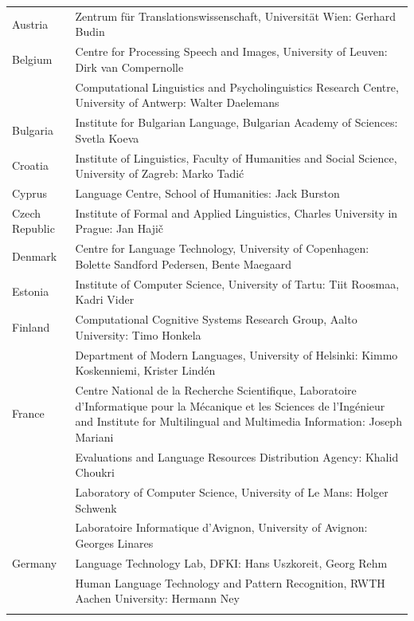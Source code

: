 \documentclass[10pt, plain]{../../metanetpaper}
\begin{document}
\begin{longtable}{@{}lp{137mm}@{}}
Austria & Zentrum für Translationswissenschaft, Universität Wien: Gerhard Budin\\ \addlinespace 
Belgium & Centre for Processing Speech and Images, University of Leuven: Dirk van Compernolle \\ \addlinespace
& Computational Linguistics and Psycholinguistics Research Centre, University of Antwerp: \newline Walter Daelemans\\ \addlinespace
Bulgaria & Institute for Bulgarian Language, Bulgarian Academy of Sciences: Svetla Koeva \\ \addlinespace
Croatia & Institute of Linguistics, Faculty of Humanities and Social Science, University of Zagreb: Marko Tadić \\ \addlinespace
Cyprus & Language Centre, School of Humanities: Jack Burston \\ \addlinespace
Czech Republic & Institute of Formal and Applied Linguistics, Charles University in Prague: Jan Hajič \\ \addlinespace
Denmark & Centre for Language Technology, University of Copenhagen: Bolette Sandford Pedersen, \newline Bente Maegaard\\ \addlinespace
Estonia & Institute of Computer Science, University of Tartu: Tiit Roosmaa, Kadri Vider\\ \addlinespace
Finland & Computational Cognitive Systems Research Group, Aalto University: Timo Honkela\\ \addlinespace
& Department of Modern Languages, University of Helsinki: Kimmo Koskenniemi, Krister Lindén \\ \addlinespace
France & Centre National de la Recherche Scientifique, Laboratoire d'Informatique pour la Mécanique et les Sciences de l'Ingénieur and Institute for Multilingual and Multimedia Information: Joseph Mariani \\ \addlinespace
& Evaluations and Language Resources Distribution Agency: Khalid Choukri\\ \addlinespace
& Laboratory of Computer Science, University of Le Mans: Holger Schwenk\\ \addlinespace
& Laboratoire Informatique d'Avignon, University of Avignon: Georges Linares\\ \addlinespace
Germany & Language Technology Lab, DFKI: Hans Uszkoreit, Georg Rehm\\ \addlinespace 
& Human Language Technology and Pattern Recognition, RWTH Aachen University: Hermann Ney \\ \addlinespace 

\end{longtable}
\end{document}
